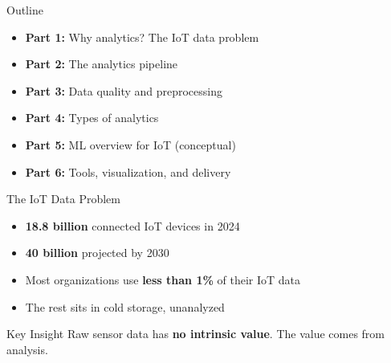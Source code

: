 \documentclass[aspectratio=169,11pt]{beamer}
\begin{document}
\begin{frame}{Outline}
    \begin{itemize}
        \item \textbf{Part 1:} Why analytics? The IoT data problem
        \item \textbf{Part 2:} The analytics pipeline
        \item \textbf{Part 3:} Data quality and preprocessing
        \item \textbf{Part 4:} Types of analytics
        \item \textbf{Part 5:} ML overview for IoT (conceptual)
        \item \textbf{Part 6:} Tools, visualization, and delivery
    \end{itemize}
\end{frame}


\begin{frame}{The IoT Data Problem}
    \begin{itemize}
        \item \textbf{18.8 billion} connected IoT devices in 2024
        \item \textbf{40 billion} projected by 2030
        \item Most organizations use \textbf{less than 1\%} of their IoT data
        \item The rest sits in cold storage, unanalyzed
    \end{itemize}

    \vspace{0.5cm}
    \begin{alertblock}{Key Insight}
        Raw sensor data has \textbf{no intrinsic value}. The value comes from analysis.
    \end{alertblock}
\end{frame}
\end{document}
